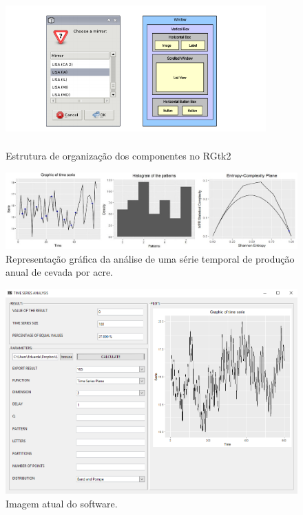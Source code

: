 \begin{figure}
  \centering
  \caption{Estrutura de organização dos componentes no RGtk2}
   \includegraphics[width=10cm,height=6cm]{capitulos/imagens/rgtk2.png}
\end{figure}
  
\begin{figure}[H]
	\centering
	\includegraphics[width=1\columnwidth]{capitulos/imagens/rplot}        
    \caption{Representação gráfica da análise de uma série temporal de produção anual de cevada por acre.}
\end{figure}
 
\begin{figure}[H]
	\centering
	\includegraphics[width=0.95\columnwidth]{capitulos/imagens/tms}   
    \caption{Imagem atual do software.}
    \vspace{6cm}
\end{figure}


